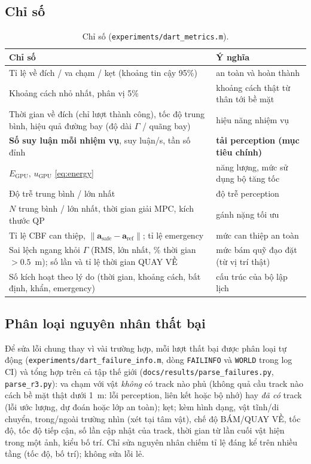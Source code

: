 \documentclass[11pt,a4paper]{article}
\numberwithin{equation}{section}
\newcommand{\vb}[1]{\bm{#1}}
\newcommand{\code}[1]{\texttt{\small #1}}
\theoremstyle{definition}
\theoremstyle{plain}
\theoremstyle{remark}
\begin{document}
\subsection{Chỉ số}
\begin{table}[h]
\centering\small
\caption{Chỉ số (\code{experiments/dart\_metrics.m}).}\label{tab:metrics}
\begin{tabular}{@{}p{7.4cm}p{7.0cm}@{}}
\toprule
Chỉ số & Ý nghĩa \\ \midrule
Tỉ lệ về đích / va chạm / kẹt (khoảng tin cậy 95\%) & an toàn và hoàn thành \\
Khoảng cách nhỏ nhất, phân vị 5\% & khoảng cách thật từ thân tới bề mặt \\
Thời gian về đích (chỉ lượt thành công), tốc độ trung bình, hiệu quả đường bay (độ dài $\Gamma$ / quãng bay) & hiệu năng nhiệm vụ \\
\textbf{Số suy luận mỗi nhiệm vụ}, suy luận/s, tần số đỉnh & \textbf{tải perception (mục tiêu chính)} \\
$E_{\text{GPU}}$, $u_{\text{GPU}}$ \eqref{eq:energy} & năng lượng, mức sử dụng bộ tăng tốc \\
Độ trễ trung bình / lớn nhất & độ trễ perception \\
$N$ trung bình / lớn nhất, thời gian giải MPC, kích thước QP & gánh nặng tối ưu \\
Tỉ lệ CBF can thiệp, $\|\vb a_{\text{safe}}-\vb a_{\text{ref}}\|$; tỉ lệ emergency & mức can thiệp an toàn \\
Sai lệch ngang khỏi $\Gamma$ (RMS, lớn nhất, \% thời gian $>0.5$~m); số lần và tỉ lệ thời gian QUAY VỀ & mức bám quỹ đạo đặt (từ vị trí thật) \\
Số kích hoạt theo lý do (thời gian, khoảng cách, bất định, khẩn, emergency) & cấu trúc của bộ lập lịch \\
\bottomrule
\end{tabular}
\end{table}

\subsection{Phân loại nguyên nhân thất bại}
\label{sec:failures}
Để sửa lỗi chung thay vì vài trường hợp, mỗi lượt thất bại được phân loại tự động (\code{experiments/dart\_failure\_info.m}, dòng \code{FAILINFO} và \code{WORLD} trong log CI) và tổng hợp trên cả tập thế giới (\code{docs/results/parse\_failures.py}, \code{parse\_r3.py}): va chạm với vật \emph{không} có track nào phủ (không quả cầu track nào cách bề mặt thật dưới 1~m: lỗi perception, liên kết hoặc bộ nhớ) hay \emph{đã có} track (lỗi ước lượng, dự đoán hoặc lớp an toàn); kẹt; kèm hình dạng, vật tĩnh/di chuyển, trong/ngoài trường nhìn (xét tại tâm vật), chế độ BÁM/QUAY VỀ, tốc độ, tốc độ tiếp cận, số lần cập nhật của track, thời gian từ lần cuối vật hiện trong một ảnh, kiểu bố trí. Chỉ sửa nguyên nhân chiếm tỉ lệ đáng kể trên nhiều tầng (tốc độ, bố trí); không sửa lỗi lẻ.
\end{document}
